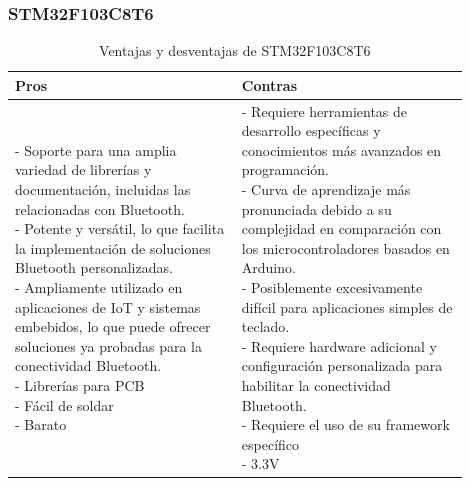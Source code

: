 \subsubsection{STM32F103C8T6}
\begin{table}[H]
\centering
\small
\begin{tabular}{|p{0.45\linewidth}|p{0.45\linewidth}|}
\hline
\textbf{Pros} &
\textbf{Contras} \\
\hline
\parbox[t]{\linewidth}{
\vspace{0.1cm}
- Soporte para una amplia variedad de librerías y documentación, incluidas las relacionadas con \gls{Bluetooth}. \medskip \\
- Potente y versátil, lo que facilita la implementación de soluciones \gls{Bluetooth} personalizadas. \medskip \\
- Ampliamente utilizado en aplicaciones de \gls{IoT} y sistemas embebidos, lo que puede ofrecer soluciones ya probadas para la conectividad \gls{Bluetooth}. \medskip \\
- Librerías para \gls{PCB} \medskip \\
- Fácil de soldar \medskip \\
- Barato
} &
\parbox[t]{\linewidth}{
\vspace{0.1cm}
- Requiere herramientas de desarrollo específicas y conocimientos más avanzados en programación. \medskip \\
- Curva de aprendizaje más pronunciada debido a su complejidad en comparación con los microcontroladores basados en Arduino. \medskip \\
- Posiblemente excesivamente difícil para aplicaciones simples de teclado. \medskip \\
- Requiere hardware adicional y configuración personalizada para habilitar la conectividad \gls{Bluetooth}. \medskip \\
- Requiere el uso de su framework específico  \medskip \\
- 3.3V} \medskip \\
\hline
\end{tabular}
\caption{Ventajas y desventajas de STM32F103C8T6}
\end{table}

